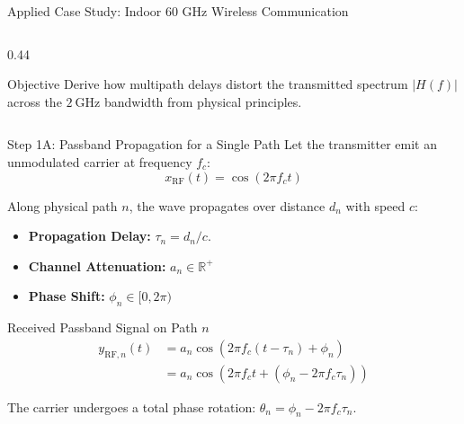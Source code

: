 \documentclass[10pt,aspectratio=169]{beamer}
\begin{document}
\begin{frame}{Applied Case Study: Indoor 60 GHz Wireless Communication}
\begin{columns}[T]
\begin{column}{0.44\textwidth}
\begin{center}
      \end{center}
      \begin{alertblock}{Objective}
        Derive how multipath delays distort the transmitted spectrum $|H(f)|$ across the $\SI{2}{\giga\hertz}$ bandwidth from physical principles.
      \end{alertblock}
    \end{column}
  \end{columns}
\end{frame}

\begin{frame}{Step 1A: Passband Propagation for a Single Path}
  Let the transmitter emit an unmodulated carrier at frequency $f_c$:
  \begin{equation}
    x_{\mathrm{RF}}(t) = \cos(2\pi f_c t)
  \end{equation}

  Along physical path $n$, the wave propagates over distance $d_n$ with speed $c$:
  \begin{itemize}
    \item \textbf{Propagation Delay:} $\tau_n = d_n / c$.
    \item \textbf{Channel Attenuation:} $a_n \in \mathbb{R}^+$ %
    \item \textbf{Phase Shift:} $\phi_n \in [0, 2\pi)$ %
  \end{itemize}

  \begin{block}{Received Passband Signal on Path $n$}
    \begin{align}
      y_{\mathrm{RF}, n}(t) &= a_n \cos\left( 2\pi f_c (t - \tau_n) + \phi_n \right) \nonumber \\
                            &= a_n \cos\left( 2\pi f_c t + (\phi_n - 2\pi f_c \tau_n) \right)
    \end{align}
  \end{block}
  The carrier undergoes a total phase rotation: $\theta_n = \phi_n - 2\pi f_c \tau_n$.
\end{frame}
\end{document}
